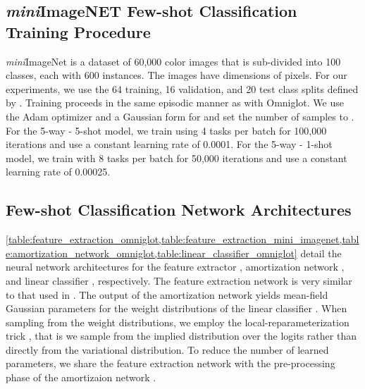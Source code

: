 \documentclass{article}
\begin{document}
\subsection{\textit{mini}ImageNET Few-shot Classification Training Procedure}
\label{app:experimention_details_miniImageNet}

\textit{mini}ImageNet \citep{vinyals2016matching} is a dataset of 60,000 color images that is sub-divided into 100 classes, each with 600 instances. The images have dimensions of  pixels. For our experiments, we use the 64 training, 16 validation, and 20 test class splits defined by \citep{ravi2016optimization}. Training proceeds in the same episodic manner as with Omniglot. We use the Adam \citep{kingma2014adam} optimizer and a Gaussian form for  and set the number of  samples to . For the 5-way - 5-shot model, we train using 4 tasks per batch for 100,000 iterations and use a constant learning rate of 0.0001. For the 5-way - 1-shot model, we train with 8 tasks per batch for 50,000 iterations and use a constant learning rate of 0.00025.



\subsection{Few-shot Classification Network Architectures}
\label{app:experimention_networks}

\cref{table:feature_extraction_omniglot,table:feature_extraction_mini_imagenet,table:amortization_network_omniglot,table:linear_classifier_omniglot} detail the neural network architectures for the feature extractor , amortization network , and linear classifier , respectively. The feature extraction network is very similar to that used in \citep{vinyals2016matching}. The output of the amortization network yields mean-field Gaussian parameters for the weight distributions of the linear classifier . When sampling from the weight distributions, we employ the local-reparameterization trick \citep{kingma2015variational}, that is we sample from the implied distribution over the logits rather than directly from the variational distribution. To reduce the number of learned parameters, we share the feature extraction network  with the pre-processing phase of the amortizaion network .
\end{document}
